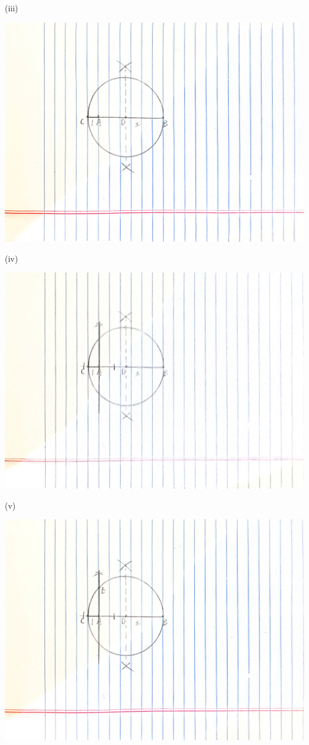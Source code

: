 \documentclass{article}
\begin{document}
(iii)

\includegraphics[scale=0.05]{HW_0214/3iii_1.jpg}

(iv)

\includegraphics[scale=0.05]{HW_0214/3iv_1.jpg}

(v)

\includegraphics[scale=0.05]{HW_0214/cv_1.jpg}
\end{document}

